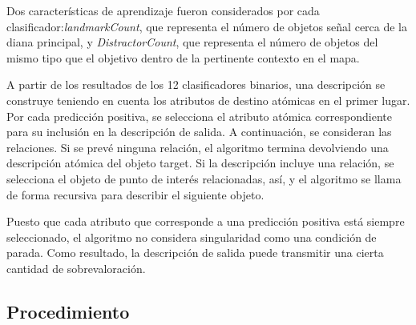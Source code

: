 Dos caracter\'{i}sticas de aprendizaje fueron considerados por cada clasificador:{\em landmarkCount}, que representa el n\'umero de objetos se\~nal cerca de la diana principal, y {\em DistractorCount}, que representa el n\'umero de objetos del mismo tipo que el objetivo dentro de la pertinente contexto en el mapa.

A partir de los resultados de los 12 clasificadores binarios, una descripci\'on se construye teniendo en cuenta los atributos de destino at\'omicas en el primer lugar. Por cada predicci\'on positiva, se selecciona el atributo at\'omica correspondiente para su inclusi\'on en la descripci\'on de salida. A continuaci\'on, se consideran las relaciones. Si se prev\'e ninguna relaci\'on, el algoritmo termina devolviendo una descripci\'on at\'omica del objeto target. Si la descripci\'on incluye una relaci\'on, se selecciona el objeto de punto de inter\'es relacionadas, as\'{i}, y el algoritmo se llama de forma recursiva para describir el siguiente objeto.

Puesto que cada atributo que corresponde a una predicci\'on positiva est\'a siempre seleccionado, el algoritmo no considera singularidad como una condici\'on de parada. Como resultado, la descripci\'on de salida puede transmitir una cierta cantidad de sobrevaloraci\'on.

\subsection{Procedimiento}



